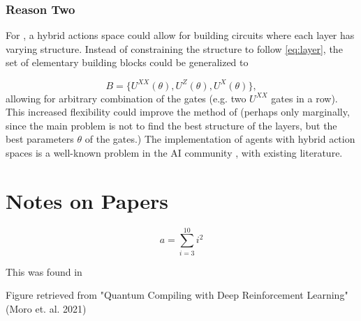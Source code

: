 \documentclass{article}
\begin{document}
\subsubsection*{Reason Two}
For \cite{DQSRL}, a hybrid actions space could allow for building circuits where each layer has varying structure. Instead of constraining the structure to follow \ref{eq:layer}, the set of elementary building blocks could be generalized to 

\begin{equation*}
    B = \{U^{XX}(\theta), U^Z(\theta), U^X(\theta)\},
\end{equation*}
allowing for arbitrary combination of the gates (e.g. two $U^{XX}$ gates in a row). This increased flexibility could improve the method of \cite{DQSRL} (perhaps only marginally, since the main problem is not to find the best structure of the layers, but the best parameters $\theta$ of the gates.) 
\newline
\newline
The implementation of agents with hybrid action spaces is a well-known problem in the AI community \cite{xiong2018parametrized}, with existing literature.  
\newpage

\section{Notes on Papers}

\begin{equation}
    a = \sum_{i=3}^{10} i^2
\end{equation}

This was found in \cite{sack2022avoiding}


Figure retrieved from "Quantum Compiling with\newline
Deep Reinforcement Learning" (Moro et. al. 2021) 





\end{document}
